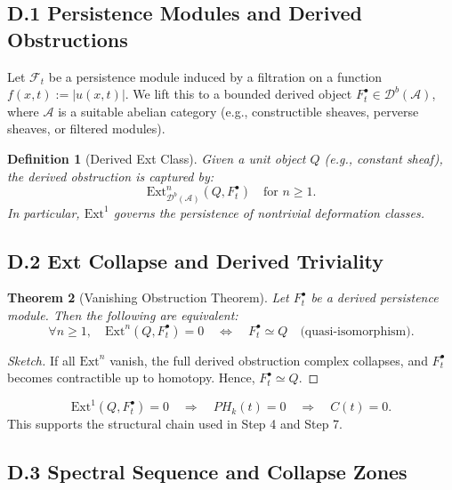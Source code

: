 \documentclass[11pt]{article}
\newtheorem{theorem}{Theorem}[section]
\newtheorem{definition}[theorem]{Definition}
\begin{document}
\subsection*{D.1 Persistence Modules and Derived Obstructions}

Let $\mathcal{F}_t$ be a persistence module induced by a filtration on a function $f(x,t) := |u(x,t)|$.  
We lift this to a bounded derived object $F_t^\bullet \in \mathcal{D}^b(\mathcal{A})$, where $\mathcal{A}$ is a suitable abelian category (e.g., constructible sheaves, perverse sheaves, or filtered modules).

\begin{definition}[Derived Ext Class]
Given a unit object $Q$ (e.g., constant sheaf), the derived obstruction is captured by:
\[
\mathrm{Ext}^n_{\mathcal{D}^b(\mathcal{A})}(Q, F^\bullet_t) \quad \text{for } n \geq 1.
\]
In particular, $\mathrm{Ext}^1$ governs the persistence of nontrivial deformation classes.
\end{definition}

\subsection*{D.2 Ext Collapse and Derived Triviality}

\begin{theorem}[Vanishing Obstruction Theorem]
Let $F^\bullet_t$ be a derived persistence module. Then the following are equivalent:
\[
\forall n \geq 1,\quad \mathrm{Ext}^n(Q, F^\bullet_t) = 0
\quad \Longleftrightarrow \quad
F^\bullet_t \simeq Q \quad \text{(quasi-isomorphism)}.
\]
\end{theorem}

\begin{proof}[Sketch]
If all $\mathrm{Ext}^n$ vanish, the full derived obstruction complex collapses, and $F^\bullet_t$ becomes contractible up to homotopy. Hence, $F^\bullet_t \simeq Q$.
\end{proof}

\begin{corollary}
\[
\mathrm{Ext}^1(Q, F^\bullet_t) = 0 \quad \Rightarrow \quad PH_k(t) = 0 \quad \Rightarrow \quad C(t) = 0.
\]
This supports the structural chain used in Step 4 and Step 7.
\end{corollary}

\subsection*{D.3 Spectral Sequence and Collapse Zones}
\end{document}
